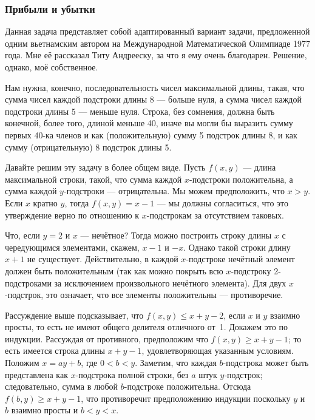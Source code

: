 \subsubsection*{Прибыли и убытки}%


Данная задача представляет собой адаптированный вариант задачи, предложенной одним вьетнамским автором на Международной Математической Олимпиаде 1977 года. 
Мне её рассказал Титу Андрееску, %
за что я ему очень благодарен. 
Решение, однако, моё собственное.


Нам нужна, конечно, последовательность чисел максимальной длины, такая, что сумма чисел каждой подстроки длины 8 --- больше нуля, а  сумма чисел каждой подстроки длины 5 --- меньше нуля.  Строка, без сомнения, должна быть конечной, более того,  длиной меньше 40, иначе  вы могли бы выразить сумму первых 40-ка членов и как  (положительную) сумму 5 подстрок длины 8, и как сумму (отрицательную)  8 подстрок длины 5. 


Давайте решим эту задачу в более общем виде. Пусть  $f(x,y)$ --- длина максимальной строки, такой, что сумма каждой $x$-подстроки положительна, а сумма каждой $y$-подстроки --- отрицательна. 
Мы можем предположить, что $x>y$. 
Если $x$ кратно $y$, тогда $f(x,y)=x-1$ --- мы должны согласиться, что это утверждение верно по отношению к $x$-подстрокам за отсутствием таковых.


Что, если  $y=2$  и  $x$ --- нечётное?
Тогда можно построить строку длины $x$ с чередующимся элементами, скажем, $x-1$ и $-x$. 
Однако такой строки длину $x+1$ не существует.
Действительно, в каждой $x$-подстроке нечётный элемент должен быть положительным 
(так как можно покрыть всю $x$-подстроку 2-подстроками за исключением произвольного нечётного элемента).  
Для двух $x$-подстрок, это означает, что все элементы положительны  ---
противоречие. 


Рассуждение выше подсказывает, что $f(x,y)\le x+y-2$,  если $x$ и $y$ взаимно просты, 
то есть не имеют общего делителя отличного от~1. 
Докажем это по индукции. 
Рассуждая от противного, предположим что $f(x,y)\ge x+y-1$;
то есть имеется строка длины $x+y-1$, удовлетворяющая указанным условиям.  
Положим $x=ay+b$, где $0<b<y$. 
Заметим, что каждая $b$-подстрока %
может быть представлена  как $x$-подстрока полной строки, 
без $a$ штук $y$-подстрок; 
следовательно, сумма в любой $b$-подстроке положительна. 
Отсюда
$f(b,y)\ge x+y-1$,
что противоречит предположению индукции поскольку $y$ и $b$ взаимно просты и $b<y<x$.

